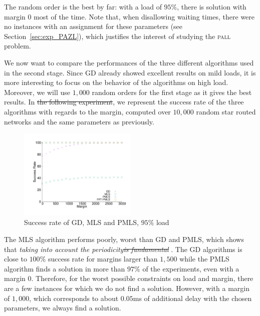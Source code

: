 \documentclass[10pt, conference, letterpaper]{IEEEtran}
\newcommand\pall{\textsc{pall}\xspace}
\providecommand{\DIFaddtex}[1]{{\protect\color{blue}\uwave{#1}}} %
\providecommand{\DIFdeltex}[1]{{\protect\color{red}\sout{#1}}}                      %
\providecommand{\DIFaddbegin}{} %
\providecommand{\DIFaddend}{} %
\providecommand{\DIFdelbegin}{} %
\providecommand{\DIFdelend}{} %
\providecommand{\DIFadd}[1]{\texorpdfstring{\DIFaddtex{#1}}{#1}} %
\providecommand{\DIFdel}[1]{\texorpdfstring{\DIFdeltex{#1}}{}} %
\newcommand{\DIFscaledelfig}{0.5}
\newlength{\DIFdelgraphicswidth} %
\newlength{\DIFdelgraphicsheight} %
\newcommand{\DIFaddincludegraphics}[2][]{{\color{blue}\fbox{\DIFOincludegraphics[#1]{#2}}}} %
\newcommand{\DIFdelincludegraphics}[2][]{%
\sbox{\DIFdelgraphicsbox}{\DIFOincludegraphics[#1]{#2}}%
\settoboxwidth{\DIFdelgraphicswidth}{\DIFdelgraphicsbox} %
\settoboxtotalheight{\DIFdelgraphicsheight}{\DIFdelgraphicsbox} %
\scalebox{\DIFscaledelfig}{%
\parbox[b]{\DIFdelgraphicswidth}{\usebox{\DIFdelgraphicsbox}\\[-\baselineskip] \rule{\DIFdelgraphicswidth}{0em}}\llap{\resizebox{\DIFdelgraphicswidth}{\DIFdelgraphicsheight}{%
\setlength{\unitlength}{\DIFdelgraphicswidth}%
\begin{picture}(1,1)%
\thicklines\linethickness{2pt} %
{\color[rgb]{1,0,0}\put(0,0){\framebox(1,1){}}}%
{\color[rgb]{1,0,0}\put(0,0){\line( 1,1){1}}}%
{\color[rgb]{1,0,0}\put(0,1){\line(1,-1){1}}}%
\end{picture}%
}\hspace*{3pt}}} %
} %
\DeclareRobustCommand{\DIFaddbegin}{\DIFOaddbegin \let\includegraphics\DIFaddincludegraphics} %
\DeclareRobustCommand{\DIFaddend}{\DIFOaddend \let\includegraphics\DIFOincludegraphics} %
\DeclareRobustCommand{\DIFdelbegin}{\DIFOdelbegin \let\includegraphics\DIFdelincludegraphics} %
\DeclareRobustCommand{\DIFdelend}{\DIFOaddend \let\includegraphics\DIFOincludegraphics} %
\begin{document}
     The random order is the best by far: with a load of $95\%$, there is \DIFaddbegin \DIFadd{a }\DIFaddend solution with margin $0$ most of the time. Note that, when disallowing waiting times, there were no instances with an assignment for these parameters (see Section~\ref{sec:exp_PAZL}), which justifies the interest of studying the \pall problem.
     \DIFaddbegin 

      \DIFaddend We now want to compare the performances of the three different algorithms used in the second stage. Since GD already showed excellent results on mild loads, it is more interesting to focus on the behavior of the algorithms on high load. Moreover, we will use $1,000$ random orders for the first stage as it gives the best results. In \DIFdelbegin \DIFdel{the following experiment}\DIFdelend \DIFaddbegin \DIFadd{Fig.~\ref{fig:success21000}}\DIFaddend , we represent the success rate of the three algorithms with regards to the margin,  computed over $10,000$ random star routed networks and the same parameters as previously.

    \begin{figure} [h] 
       \begin{center}
      \includegraphics[width=0.5\textwidth]{retour_21000.pdf}
      \end{center}
      \caption{Success rate of GD, MLS and PMLS, $95\%$ load}
     \label{fig:success21000}
     \end{figure}

     The MLS algorithm performs poorly, worst than GD and PMLS, which shows that \emph{taking into account the periodicity\DIFdelbegin \DIFdel{is fundamental}\DIFdelend } \DIFaddbegin \DIFadd{is fundamental}\DIFaddend .
     The GD algorithms is close to $100\%$ success rate for margins larger than $1,500$ while the PMLS algorithm finds a solution in more than $97\%$ of the experiments, even with a margin $0$. Therefore, for the worst possible constraints on load and margin, there are a few instances for which we do not find a solution. However, with a margin of $1,000$, which corresponds to about $0.05$ms of additional delay with the chosen parameters, we always find a solution. 
\end{document}
